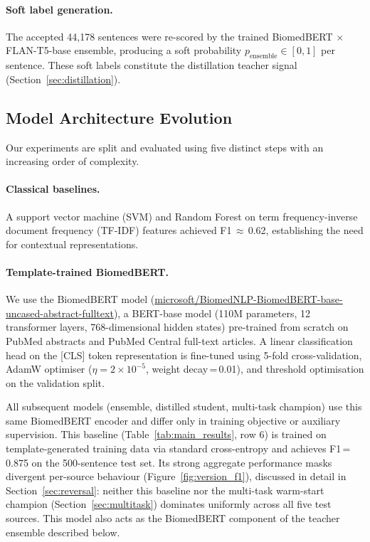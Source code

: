 \documentclass[a4paper,fleqn]{cas-sc}
\begin{document}
\paragraph{Soft label generation.}
The accepted 44,178 sentences were re-scored by the trained BiomedBERT
$\times$ FLAN-T5-base ensemble, producing a soft probability
$p_\text{ensemble} \in [0,1]$ per sentence. These soft labels constitute
the distillation teacher signal (Section~\ref{sec:distillation}).

\subsection{Model Architecture Evolution}
\label{sec:architectures}

Our experiments are split and evaluated using five distinct steps with an increasing order of
complexity.

\paragraph{Classical baselines.}
A support vector machine (SVM) and Random Forest on term frequency-inverse
document frequency (TF-IDF) features achieved F1\,$\approx$\,0.62,
establishing the need for contextual representations.

\paragraph{Template-trained BiomedBERT.}
We use the BiomedBERT model \citep{gu2021domain}
(\url{microsoft/BiomedNLP-BiomedBERT-base-uncased-abstract-fulltext}),
a BERT-base model (110M parameters, 12 transformer
layers, 768-dimensional hidden states) pre-trained from scratch on PubMed
abstracts and PubMed Central full-text articles. A linear classification
head on the [CLS] token representation is fine-tuned using 5-fold
cross-validation, AdamW optimiser ($\eta = 2 \times 10^{-5}$, weight
decay\,=\,0.01), and threshold optimisation on the validation split.

All subsequent models (ensemble, distilled student, multi-task champion)
use this same BiomedBERT encoder and differ only in training objective or
auxiliary supervision. This baseline (Table~\ref{tab:main_results}, row 6)
is trained on template-generated training data via standard
cross-entropy and achieves F1\,=\,0.875 on the 500-sentence test set.
Its strong aggregate performance masks divergent per-source behaviour
(Figure~\ref{fig:version_f1}), discussed in detail in
Section~\ref{sec:reversal}: neither this baseline nor the multi-task
warm-start champion (Section~\ref{sec:multitask}) dominates uniformly
across all five test sources.
This model also acts as the BiomedBERT component of the teacher ensemble
described below.
\end{document}
